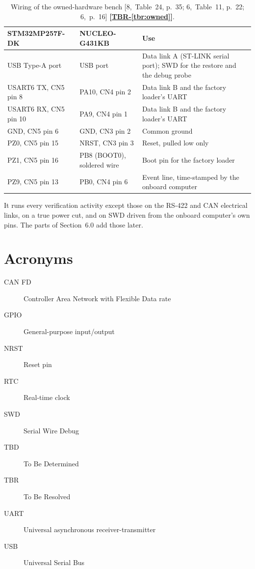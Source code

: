 \documentclass[11pt,a4paper]{article}
\renewcommand{\thesection}{\arabic{section}.0}
\newcommand{\tbr}[1]{\mbox{\textbf{[\hyperref[tbr:#1]{TBR-\ref*{tbr:#1}}]}}}
\begin{document}
\begin{table}[H]
\centering
{\small\begin{tabularx}{\textwidth}{@{}>{\raggedright\arraybackslash}p{3.4cm}>{\raggedright\arraybackslash}p{3.6cm}>{\raggedright\arraybackslash}X@{}}
\toprule
STM32MP257F-DK & NUCLEO-G431KB & Use \\
\midrule
USB Type-A port & USB port & Data link A (ST-LINK serial port); SWD for the restore and the debug probe \\
USART6 TX, CN5 pin 8 & PA10, CN4 pin 2 & Data link B and the factory loader's UART \\
USART6 RX, CN5 pin 10 & PA9, CN4 pin 1 & Data link B and the factory loader's UART \\
GND, CN5 pin 6 & GND, CN3 pin 2 & Common ground \\
PZ0, CN5 pin 15 & NRST, CN3 pin 3 & Reset, pulled low only \\
PZ1, CN5 pin 16 & PB8 (BOOT0), soldered wire & Boot pin for the factory loader \\
PZ9, CN5 pin 13 & PB0, CN4 pin 6 & Event line, time-stamped by the onboard computer \\
\bottomrule
\end{tabularx}}
\caption{Wiring of the owned-hardware bench [8,~Table~24, p.~35; 6,~Table~11, p.~22; 6,~p.~16]
\tbr{owned}.}
\label{tab:wires}
\end{table}

\noindent It runs every verification activity except those on the RS-422 and
CAN electrical links, on a true power cut, and on SWD driven from the onboard
computer's own pins. The parts of Section~6.0 add those later.

\appendix
\renewcommand{\thesection}{\Alph{section}}

\section{Acronyms}
\begin{description}
\item[CAN FD] Controller Area Network with Flexible Data rate
\item[GPIO] General-purpose input/output
\item[NRST] Reset pin
\item[RTC] Real-time clock
\item[SWD] Serial Wire Debug
\item[TBD] To Be Determined
\item[TBR] To Be Resolved
\item[UART] Universal asynchronous receiver-transmitter
\item[USB] Universal Serial Bus
\end{description}
\end{document}
